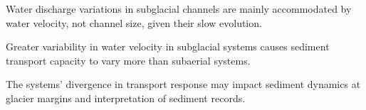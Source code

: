 \documentclass[draft]{agujournal2019}
\begin{document}








\begin{keypoints}
\item Water discharge variations in subglacial channels are mainly accommodated by water velocity, not channel size, given their slow evolution.

\item Greater variability in water velocity in subglacial systems causes sediment transport capacity to vary more than subaerial systems.

\item The systems' divergence in transport response may impact sediment dynamics at glacier margins and interpretation of sediment records.
\end{keypoints}


% 
% 

% 
% 
\end{document}
